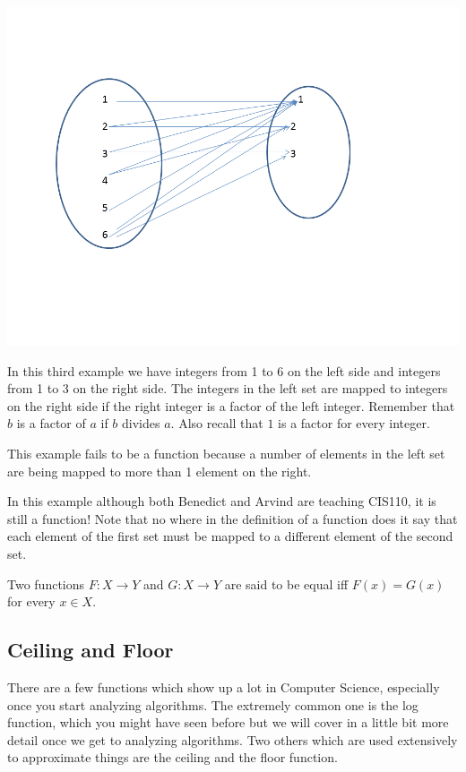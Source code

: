 \documentclass[12pt]{article}
\begin{document}
\includegraphics[scale=0.5]{func3.png}

In this third example we have integers from 1 to 6 on the left side and integers from 1 to 3 on the right side. 
The integers in the left set are mapped to integers on the right side if the right integer is a factor of the left integer. Remember that $b$ is a factor of $a$ if $b$ divides $a$. Also recall that $1$ is a factor for every integer.

This example fails to be a function because a number of elements in the left set are being mapped to more than 1 element on the right.


In this example although both Benedict and Arvind are teaching CIS110, it is still a function! Note that no where in the definition of a function does it say that each element of the first set must be mapped to a different element of the second set.

Two functions $F: X \rightarrow Y$ and $G: X \rightarrow Y$ are said to be equal iff $F(x) = G(x)$ for every $x \in X$.

\subsection*{Ceiling and Floor}
There are a few functions which show up a lot in Computer Science, especially once you start analyzing algorithms. The extremely common one is the log function, which you might have seen before but we will cover in a little bit more detail once we get to analyzing algorithms.
Two others which are used extensively to approximate things are the ceiling and the floor function.
\end{document}
